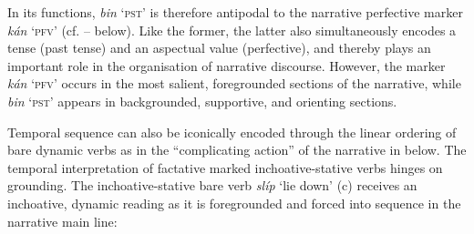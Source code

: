 In its functions, \textit{bin} ‘\textsc{pst}’ is therefore antipodal to the narrative perfective marker \textit{kán} ‘\textsc{pfv}’ (cf. – below). Like the former, the latter also simultaneously encodes a tense (past tense) and an aspectual value (perfective), and thereby plays an important role in the organisation of narrative discourse. However, the marker \textit{kán} ‘\textsc{pfv}’ occurs in the most salient, foregrounded sections of the narrative, while \textit{bin} ‘\textsc{pst}’ appears in backgrounded, supportive, and orienting sections. 


Temporal sequence can also be iconically encoded through the linear ordering of bare dynamic verbs as in the “complicating action” \citep{Labov1972} of the narrative in  below. The temporal interpretation of factative marked inchoative-stative verbs hinges on grounding. The inchoative-stative bare verb \textit{slíp} ‘lie down’ (c) receives an inchoative, dynamic reading as it is foregrounded and forced into sequence in the narrative main line:



\ea
\label{ex:key:457}
\z
\z

